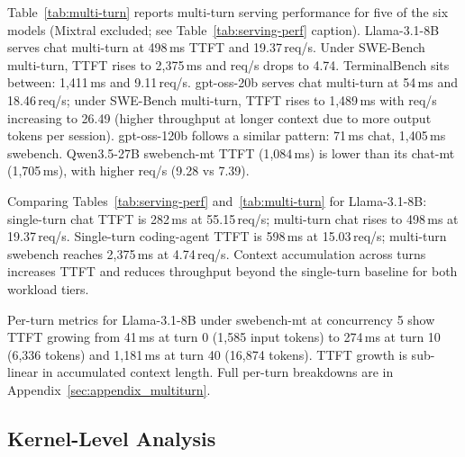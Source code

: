 Table~\ref{tab:multi-turn} reports multi-turn serving performance for five of the six models (Mixtral excluded; see Table~\ref{tab:serving-perf} caption). Llama-3.1-8B serves chat multi-turn at 498\,ms TTFT and 19.37\,req/s. Under SWE-Bench multi-turn, TTFT rises to 2{,}375\,ms and req/s drops to 4.74. TerminalBench sits between: 1{,}411\,ms and 9.11\,req/s. gpt-oss-20b serves chat multi-turn at 54\,ms and 18.46\,req/s; under SWE-Bench multi-turn, TTFT rises to 1{,}489\,ms with req/s increasing to 26.49 (higher throughput at longer context due to more output tokens per session). gpt-oss-120b follows a similar pattern: 71\,ms chat, 1{,}405\,ms swebench. Qwen3.5-27B swebench-mt TTFT (1{,}084\,ms) is lower than its chat-mt (1{,}705\,ms), with higher req/s (9.28 vs 7.39).

Comparing Tables~\ref{tab:serving-perf} and~\ref{tab:multi-turn} for Llama-3.1-8B: single-turn chat TTFT is 282\,ms at 55.15\,req/s; multi-turn chat rises to 498\,ms at 19.37\,req/s. Single-turn coding-agent TTFT is 598\,ms at 15.03\,req/s; multi-turn swebench reaches 2{,}375\,ms at 4.74\,req/s. Context accumulation across turns increases TTFT and reduces throughput beyond the single-turn baseline for both workload tiers.

Per-turn metrics for Llama-3.1-8B under swebench-mt at concurrency 5 show TTFT growing from 41\,ms at turn 0 (1{,}585 input tokens) to 274\,ms at turn 10 (6{,}336 tokens) and 1{,}181\,ms at turn 40 (16{,}874 tokens). TTFT growth is sub-linear in accumulated context length. Full per-turn breakdowns are in Appendix~\ref{sec:appendix_multiturn}.


\subsection{Kernel-Level Analysis}
\label{sec:kernel_roofline}


